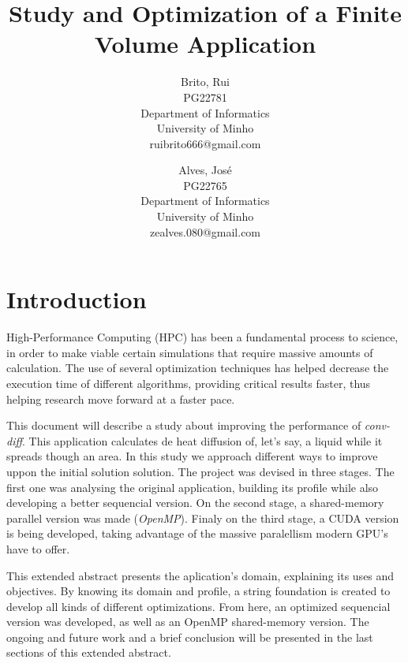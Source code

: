 \documentclass[a4paper,10pt,openright,openbib,twocolumn]{article}
\begin{document}
\begin{multicols}{2}
\title{Study and Optimization of a Finite Volume Application}
\author{
    Brito, Rui\\
    PG22781\\
    Department of Informatics\\
    University of Minho\\
    ruibrito666@gmail.com
  \and
    Alves, José\\
    PG22765\\
    Department of Informatics\\
    University of Minho\\
    zealves.080@gmail.com
}
\date{}
\maketitle
\end{multicols}

\section{Introduction}    %

High-Performance Computing (HPC) has been a fundamental process to science, in order to make viable certain simulations that require massive amounts of calculation. The use of several optimization techniques has helped decrease the execution time of different algorithms, providing critical results faster, thus helping research move forward at a faster pace.

This document will describe a study about improving the performance of \emph{conv-diff}. This application calculates de heat diffusion of, let's say, a liquid while it spreads though an area. In this study we approach different ways to improve uppon the initial solution solution. The project was devised in three stages. The first one was analysing the original application, building its profile while also developing a better sequencial version. 
On the second stage, a shared-memory parallel version was made (\emph{OpenMP}). Finaly on the third stage, a CUDA version is being developed, taking advantage of the massive paralellism modern GPU's have to offer.

This extended abstract presents the aplication's domain, explaining its uses and objectives. By knowing its domain and profile, a string foundation is created to develop all kinds of different optimizations. From here, an optimized sequencial version was developed, as well as an OpenMP shared-memory version. The ongoing and future work and a brief conclusion will be presented in the last sections of this extended abstract.
\end{document}
